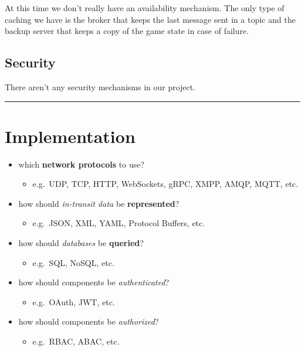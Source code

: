 \documentclass{scrartcl}
\begin{document}
At this time we don't really have an availability mechanism. \newline
The only type of caching we have is the broker that keeps the last message sent in a topic
and the backup server that keeps a copy of the game state in case of failure.

\subsection{Security}\label{security}

There aren't any security mechanisms in our project. \newline


\begin{center}\rule{0.5\linewidth}{0.5pt}\end{center}

\section{Implementation}\label{implementation}

\begin{itemize}
  \item which \textbf{network protocols} to use?

  \begin{itemize}
    \item e.g.~UDP, TCP, HTTP, WebSockets, gRPC, XMPP, AMQP, MQTT, etc.
  \end{itemize}
  \item how should \emph{in-transit data} be \textbf{represented}?

  \begin{itemize}
    \item e.g.~JSON, XML, YAML, Protocol Buffers, etc.
  \end{itemize}
  \item how should \emph{databases} be \textbf{queried}?

  \begin{itemize}
    \item e.g.~SQL, NoSQL, etc.
  \end{itemize}
  \item how should components be \emph{authenticated}?

  \begin{itemize}
    \item e.g.~OAuth, JWT, etc.
  \end{itemize}
  \item how should components be \emph{authorized}?

  \begin{itemize}
    \item e.g.~RBAC, ABAC, etc.
  \end{itemize}
\end{itemize}
\end{document}
